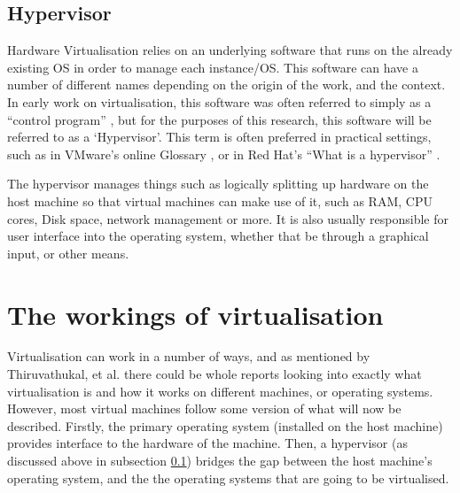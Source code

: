 \subsection{Hypervisor}
\label{subsec:hypervisor}
Hardware Virtualisation relies on an underlying software that runs on the already existing OS in order to manage each instance/OS. This software can have a number of different names depending on the origin of the work, and the context. In early work on virtualisation, this software was often referred to simply as a ``control program'' \citep{creasy1981}, but for the purposes of this research, this software will be referred to as a `Hypervisor'. This term is often preferred in practical settings, such as in VMware's online Glossary \citep{vmwareHypervisor}, or in Red Hat's ``What is a hypervisor'' \citep{redhat2021}.

The hypervisor manages things such as logically splitting up hardware on the host machine so that virtual machines can make use of it, such as RAM, CPU cores, Disk space, network management or more\citep{fragni2010evaluating}. It is also usually responsible for user interface into the operating system, whether that be through a graphical input, or other means.


\section{The workings of virtualisation}
Virtualisation can work in a number of ways, and as mentioned by Thiruvathukal, et al. there could be whole reports looking into exactly what virtualisation is \citep{VMwareWorking} and how it works on different machines, or operating systems. However, most virtual machines follow some version of what will now be described. Firstly, the primary operating system (installed on the host machine) provides interface to the hardware of the machine. Then, a hypervisor (as discussed above in subsection \ref{subsec:hypervisor}) bridges the gap between the host machine's operating system, and the the operating systems that are going to be virtualised\citep{fragni2010evaluating}.

